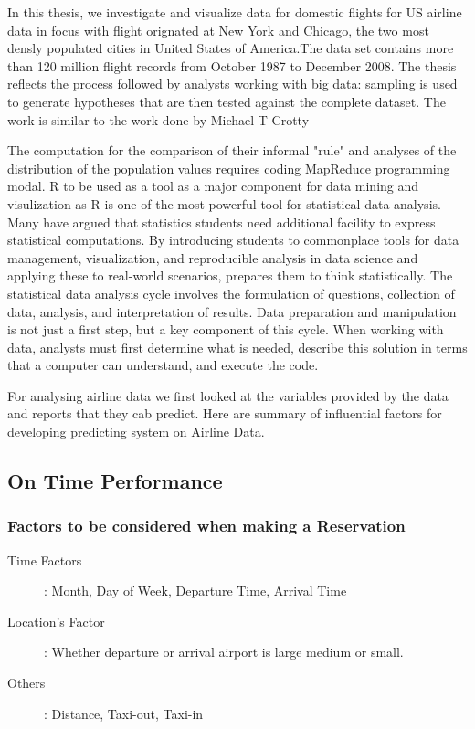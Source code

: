 In this thesis, we investigate and visualize data for domestic flights for US airline data in focus with flight orignated at New York and Chicago, the two most densly populated cities in United States of America.The data set contains more than 120 million flight records from October 1987 to December 2008. The thesis reflects the process followed by analysts working with big data: sampling is used to generate hypotheses that are then tested against the complete dataset. The work is similar to the work done by Michael T Crotty\cite{crotty2012Raeligh} 

The computation for the comparison of their informal "rule" and analyses of the distribution of the population values requires coding MapReduce programming modal. R to be used as a tool as a major component for data mining and visulization as R is one of the most powerful tool for statistical data analysis. Many have argued that statistics students need additional facility to express statistical computations. By
introducing students to commonplace tools for data management, visualization, and reproducible analysis in data science and applying these to real-world scenarios, prepares them to think statistically. The statistical data analysis cycle involves the formulation of
questions, collection of data, analysis, and interpretation of results. Data preparation and manipulation is not just a first step, but a key component of this cycle. When working with data, analysts must first determine what is needed, describe this solution in terms that a computer can understand, and execute the code.

For analysing airline data we first looked at the variables provided by the data and reports that they cab predict. Here are summary of influential factors for developing predicting system on Airline Data.
\subsection{On Time Performance} 
\subsubsection{Factors to be considered when making a Reservation}
\begin{description}
  \item[Time Factors]: Month, Day of Week, Departure Time, Arrival Time
  \item[Location's Factor]: Whether departure or arrival airport is large medium or small.
  \item[Others]: Distance, Taxi-out, Taxi-in
\end{description}

